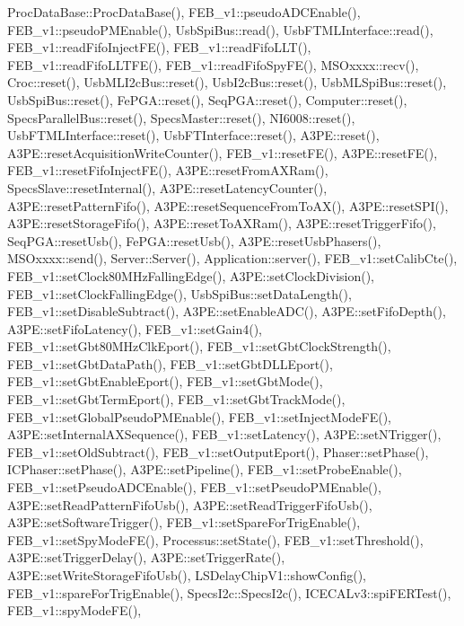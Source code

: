 Proc\+Data\+Base\+::\+Proc\+Data\+Base(), F\+E\+B\+\_\+v1\+::pseudo\+A\+D\+C\+Enable(), F\+E\+B\+\_\+v1\+::pseudo\+P\+M\+Enable(), Usb\+Spi\+Bus\+::read(), Usb\+F\+T\+M\+L\+Interface\+::read(), F\+E\+B\+\_\+v1\+::read\+Fifo\+Inject\+F\+E(), F\+E\+B\+\_\+v1\+::read\+Fifo\+L\+L\+T(), F\+E\+B\+\_\+v1\+::read\+Fifo\+L\+L\+T\+F\+E(), F\+E\+B\+\_\+v1\+::read\+Fifo\+Spy\+F\+E(), M\+S\+Oxxxx\+::recv(), Croc\+::reset(), Usb\+M\+L\+I2c\+Bus\+::reset(), Usb\+I2c\+Bus\+::reset(), Usb\+M\+L\+Spi\+Bus\+::reset(), Usb\+Spi\+Bus\+::reset(), Fe\+P\+G\+A\+::reset(), Seq\+P\+G\+A\+::reset(), Computer\+::reset(), Specs\+Parallel\+Bus\+::reset(), Specs\+Master\+::reset(), N\+I6008\+::reset(), Usb\+F\+T\+M\+L\+Interface\+::reset(), Usb\+F\+T\+Interface\+::reset(), A3\+P\+E\+::reset(), A3\+P\+E\+::reset\+Acquisition\+Write\+Counter(), F\+E\+B\+\_\+v1\+::reset\+F\+E(), A3\+P\+E\+::reset\+F\+E(), F\+E\+B\+\_\+v1\+::reset\+Fifo\+Inject\+F\+E(), A3\+P\+E\+::reset\+From\+A\+X\+Ram(), Specs\+Slave\+::reset\+Internal(), A3\+P\+E\+::reset\+Latency\+Counter(), A3\+P\+E\+::reset\+Pattern\+Fifo(), A3\+P\+E\+::reset\+Sequence\+From\+To\+A\+X(), A3\+P\+E\+::reset\+S\+P\+I(), A3\+P\+E\+::reset\+Storage\+Fifo(), A3\+P\+E\+::reset\+To\+A\+X\+Ram(), A3\+P\+E\+::reset\+Trigger\+Fifo(), Seq\+P\+G\+A\+::reset\+Usb(), Fe\+P\+G\+A\+::reset\+Usb(), A3\+P\+E\+::reset\+Usb\+Phasers(), M\+S\+Oxxxx\+::send(), Server\+::\+Server(), Application\+::server(), F\+E\+B\+\_\+v1\+::set\+Calib\+Cte(), F\+E\+B\+\_\+v1\+::set\+Clock80\+M\+Hz\+Falling\+Edge(), A3\+P\+E\+::set\+Clock\+Division(), F\+E\+B\+\_\+v1\+::set\+Clock\+Falling\+Edge(), Usb\+Spi\+Bus\+::set\+Data\+Length(), F\+E\+B\+\_\+v1\+::set\+Disable\+Subtract(), A3\+P\+E\+::set\+Enable\+A\+D\+C(), A3\+P\+E\+::set\+Fifo\+Depth(), A3\+P\+E\+::set\+Fifo\+Latency(), F\+E\+B\+\_\+v1\+::set\+Gain4(), F\+E\+B\+\_\+v1\+::set\+Gbt80\+M\+Hz\+Clk\+Eport(), F\+E\+B\+\_\+v1\+::set\+Gbt\+Clock\+Strength(), F\+E\+B\+\_\+v1\+::set\+Gbt\+Data\+Path(), F\+E\+B\+\_\+v1\+::set\+Gbt\+D\+L\+L\+Eport(), F\+E\+B\+\_\+v1\+::set\+Gbt\+Enable\+Eport(), F\+E\+B\+\_\+v1\+::set\+Gbt\+Mode(), F\+E\+B\+\_\+v1\+::set\+Gbt\+Term\+Eport(), F\+E\+B\+\_\+v1\+::set\+Gbt\+Track\+Mode(), F\+E\+B\+\_\+v1\+::set\+Global\+Pseudo\+P\+M\+Enable(), F\+E\+B\+\_\+v1\+::set\+Inject\+Mode\+F\+E(), A3\+P\+E\+::set\+Internal\+A\+X\+Sequence(), F\+E\+B\+\_\+v1\+::set\+Latency(), A3\+P\+E\+::set\+N\+Trigger(), F\+E\+B\+\_\+v1\+::set\+Old\+Subtract(), F\+E\+B\+\_\+v1\+::set\+Output\+Eport(), Phaser\+::set\+Phase(), I\+C\+Phaser\+::set\+Phase(), A3\+P\+E\+::set\+Pipeline(), F\+E\+B\+\_\+v1\+::set\+Probe\+Enable(), F\+E\+B\+\_\+v1\+::set\+Pseudo\+A\+D\+C\+Enable(), F\+E\+B\+\_\+v1\+::set\+Pseudo\+P\+M\+Enable(), A3\+P\+E\+::set\+Read\+Pattern\+Fifo\+Usb(), A3\+P\+E\+::set\+Read\+Trigger\+Fifo\+Usb(), A3\+P\+E\+::set\+Software\+Trigger(), F\+E\+B\+\_\+v1\+::set\+Spare\+For\+Trig\+Enable(), F\+E\+B\+\_\+v1\+::set\+Spy\+Mode\+F\+E(), Processus\+::set\+State(), F\+E\+B\+\_\+v1\+::set\+Threshold(), A3\+P\+E\+::set\+Trigger\+Delay(), A3\+P\+E\+::set\+Trigger\+Rate(), A3\+P\+E\+::set\+Write\+Storage\+Fifo\+Usb(), L\+S\+Delay\+Chip\+V1\+::show\+Config(), F\+E\+B\+\_\+v1\+::spare\+For\+Trig\+Enable(), Specs\+I2c\+::\+Specs\+I2c(), I\+C\+E\+C\+A\+Lv3\+::spi\+F\+E\+R\+Test(), F\+E\+B\+\_\+v1\+::spy\+Mode\+F\+E(), 